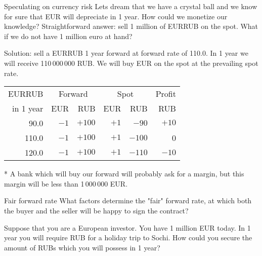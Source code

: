 \documentclass{beamer}
\begin{document}
\begin{frame}{Speculating on currency risk}
\justify
Lets dream that we have a crystal ball and we know for sure that EUR will depreciate in 1 year. How could we monetize our knowledge? Straightforward answer: sell 1 million of EURRUB on the spot. What if we do not have 1 million euro at hand?

\justify
Solution: sell a EURRUB 1 year forward at forward rate of 110.0. In 1 year  we will receive 110\,000\,000 RUB. We will buy EUR on the spot at the prevailing spot rate.

\justify
\centering
\begin{tabular}{r|r|r|r|r|r}
EURRUB      & \multicolumn{2}{c|}{Forward} & \multicolumn{2}{c|}{Spot} & Profit \\
\cline{2-5}
in 1 year & EUR     & RUB     & EUR     & RUB      & RUB \\ \hline
90.0      & $-1$ & $+100$  & $+1$ & $-90$ & $+10$ \\
110.0      & $-1$ & $+100$  & $+1$ & $-100$ & 0 \\
120.0     & $-1$& $+100$  & $+1$ & $-110$ & $-10$ \\
\end{tabular}
 
\justify
* A bank which will buy our forward will probably ask for a margin, but this margin will be less than 1\,000\,000 EUR.
\end{frame}



\begin{frame}{Fair forward rate}
\justify
What factors determine the "fair" forward rate, at which both the buyer and the seller will be happy to sign the contract? 

\justify
Suppose that you are a European investor. You have 1 million EUR today. In 1 year you will require RUB for a holiday trip to Sochi. How could you secure the amount of RUBs which you will possess in 1 year?
\end{frame}
\end{document}
